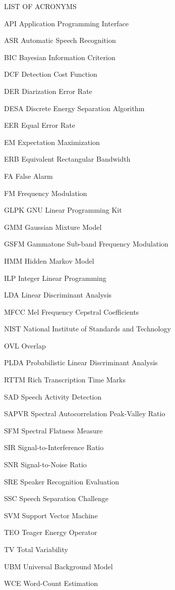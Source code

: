 \documentclass[doublespacing]{utdthesis}
\newcommand{\abbrlabel}[1]{\makebox[3cm][l]{#1\ \dotfill}}
\newenvironment{abbreviations}{\begin{list}{}{\renewcommand{\makelabel}{\abbrlabel}}}{\end{list}}
\begin{document}
\newpage
\begin{table}
	\caption{LIST OF ACRONYMS}
\end{table}
\begin{abbreviations}
	\item[API] Application Programming Interface
	\item[ASR] Automatic Speech Recognition
	\item[BIC] Bayesian Information Criterion
	\item[DCF] Detection Cost Function
	\item[DER] Diarization Error Rate
	\item[DESA] Discrete Energy Separation Algorithm
	\item[EER] Equal Error Rate
	\item[EM] Expectation Maximization
	\item[ERB] Equivalent Rectangular Bandwidth
	\item[FA] False Alarm
	\item[FM] Frequency Modulation
	\item[GLPK] GNU Linear Programming Kit
	\item[GMM] Gaussian Mixture Model
	\item[GSFM] Gammatone Sub-band Frequency Modulation
	\item[HMM] Hidden Markov Model
	\item[ILP] Integer Linear Programming
	\item[LDA] Linear Discriminant Analysis
	\item[MFCC] Mel Frequency Cepstral Coefficients
	\item[NIST] National Institute of Standards and Technology
	\item[OVL] Overlap
	\item[PLDA] Probabilistic Linear Discriminant Analysis
	\item[RTTM] Rich Transcription Time Marks
	\item[SAD] Speech Activity Detection
	\item[SAPVR] Spectral Autocorrelation Peak-Valley Ratio
	\item[SFM] Spectral Flatness Measure
	\item[SIR] Signal-to-Interference Ratio
	\item[SNR] Signal-to-Noise Ratio
	\item[SRE] Speaker Recognition Evaluation
	\item[SSC] Speech Separation Challenge
	\item[SVM] Support Vector Machine
	\item[TEO] Teager Energy Operator
	\item[TV] Total Variability
	\item[UBM] Universal Background Model
	\item[WCE] Word-Count Estimation
\end{abbreviations}
\end{document}
